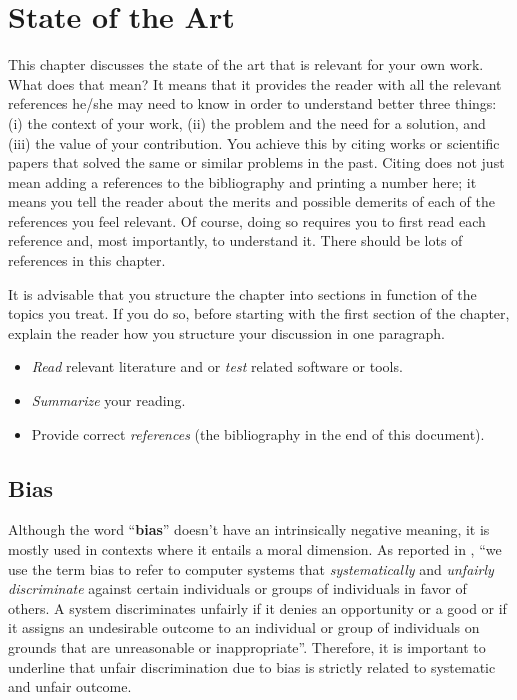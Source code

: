 \chapter{State of the Art}
\label{capitolo2}
\thispagestyle{empty}

This chapter discusses the state of the art that is relevant for your own work. What does that mean? It means that it provides the reader with all the relevant references he/she may need to know in order to understand better three things: (i) the context of your work, (ii) the problem and the need for a solution, and (iii) the value of your contribution. You achieve this by citing works or scientific papers that solved the same or similar problems in the past. Citing does not just mean adding a references to the bibliography and printing a number here; it means you tell the reader about the merits and possible demerits of each of the references you feel relevant. Of course, doing so requires you to first read each reference and, most importantly, to understand it. There should be lots of references in this chapter. 

It is advisable that you structure the chapter into sections in function of the topics you treat. If you do so, before starting with the first section of the chapter, explain the reader how you structure your discussion in one paragraph.

\begin{itemize}
\item[\Square] \emph{Read} relevant literature and or \emph{test} related software or tools.
\item[\Square] \emph{Summarize} your reading.
\item[\Square] Provide correct \emph{references} (the bibliography in the end of this document).
\end{itemize}


\section{Bias}
Although the word ``\textbf{bias}'' doesn't have an intrinsically negative meaning, it is mostly used in contexts where it entails a moral dimension. As reported in \cite{friedman2017bias}, ``we use the term bias to refer to computer systems that \textit{systematically} and \textit{unfairly discriminate} against certain individuals or groups of individuals in favor of others. A system discriminates unfairly if it denies an opportunity or a good or if it assigns an undesirable outcome to an individual or group of individuals on grounds that are unreasonable or inappropriate''. Therefore, it is important to underline that unfair discrimination due to bias is strictly related to systematic and unfair outcome.

